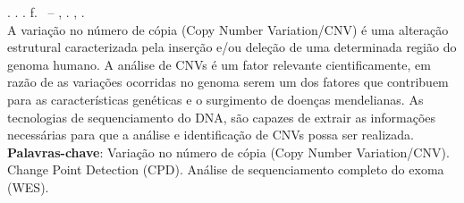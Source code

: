 
\begin{resumo}[RESUMO]
\begin{SingleSpacing}

\imprimirautorcitacao. \imprimirtitulo. \imprimirdata. \pageref {LastPage} f. \imprimirprojeto\ – \imprimirprograma, \imprimirinstituicao. \imprimirlocal, \imprimirdata.\\

A variação no número de cópia (Copy Number Variation/CNV) é uma alteração estrutural caracterizada pela inserção e/ou deleção de uma determinada região do genoma humano.
A análise de CNVs é um fator relevante cientificamente, em razão de as variações ocorridas no genoma serem um dos fatores que contribuem para as características genéticas e o surgimento de doenças mendelianas.
As tecnologias de sequenciamento do DNA, são capazes de extrair as informações necessárias para que a análise e identificação de CNVs possa ser realizada. \\



\textbf{Palavras-chave}: Variação no número de cópia (Copy Number Variation/CNV). Change Point Detection (CPD). Análise de sequenciamento completo do exoma (WES).

\end{SingleSpacing}
\end{resumo}

